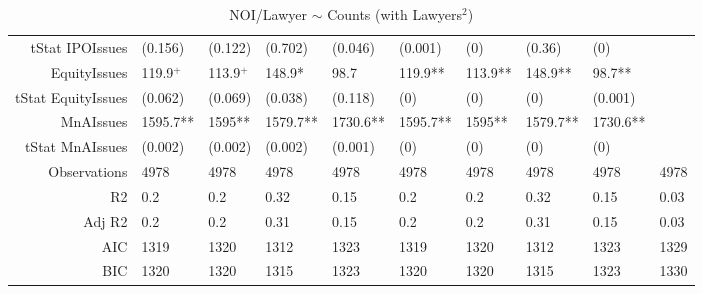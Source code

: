 \begin{table}[ht]
\begin{tabular}{rlllllllll}
  tStat IPOIssues & (0.156) & (0.122) & (0.702) & (0.046) & (0.001) & (0) & (0.36) & (0) &  \\ 
  EquityIssues & 119.9$^{+}$ & 113.9$^{+}$ & 148.9* & 98.7 & 119.9** & 113.9** & 148.9** & 98.7** &  \\ 
  tStat EquityIssues & (0.062) & (0.069) & (0.038) & (0.118) & (0) & (0) & (0) & (0.001) &  \\ 
  MnAIssues & 1595.7** & 1595** & 1579.7** & 1730.6** & 1595.7** & 1595** & 1579.7** & 1730.6** &  \\ 
  tStat MnAIssues & (0.002) & (0.002) & (0.002) & (0.001) & (0) & (0) & (0) & (0) &  \\ 
  Observations & 4978 & 4978 & 4978 & 4978 & 4978 & 4978 & 4978 & 4978 & 4978 \\ 
  R2 & 0.2 & 0.2 & 0.32 & 0.15 & 0.2 & 0.2 & 0.32 & 0.15 & 0.03 \\ 
  Adj R2 & 0.2 & 0.2 & 0.31 & 0.15 & 0.2 & 0.2 & 0.31 & 0.15 & 0.03 \\ 
  AIC & 1319 & 1320 & 1312 & 1323 & 1319 & 1320 & 1312 & 1323 & 1329 \\ 
  BIC & 1320 & 1320 & 1315 & 1323 & 1320 & 1320 & 1315 & 1323 & 1330 \\ 
   \hline
\end{tabular}
\caption{NOI/Lawyer $\sim$ Counts (with Lawyers$^2$)} 
\end{table}
